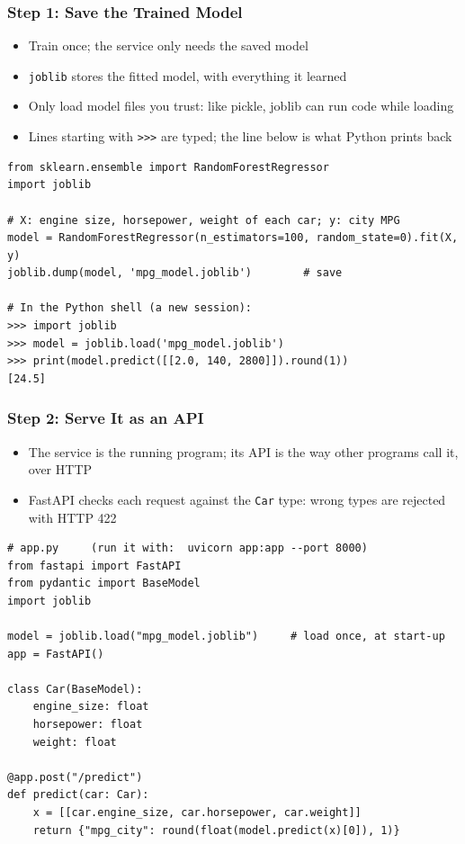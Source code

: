 \begin{frame}[fragile]\frametitle{Step 1: Save the Trained Model}
\begin{itemize}
\item Train once; the service only needs the saved model
\item \texttt{joblib} stores the fitted model, with everything it learned
\item Only load model files you trust: like pickle, joblib can run code while loading
\item Lines starting with \texttt{>>>} are typed; the line below is what Python prints back
\end{itemize}
\begin{lstlisting}
from sklearn.ensemble import RandomForestRegressor
import joblib

# X: engine size, horsepower, weight of each car; y: city MPG
model = RandomForestRegressor(n_estimators=100, random_state=0).fit(X, y)
joblib.dump(model, 'mpg_model.joblib')        # save

# In the Python shell (a new session):
>>> import joblib
>>> model = joblib.load('mpg_model.joblib')
>>> print(model.predict([[2.0, 140, 2800]]).round(1))
[24.5]
\end{lstlisting}
\end{frame}

\begin{frame}[fragile]\frametitle{Step 2: Serve It as an API}
\begin{itemize}
\item The service is the running program; its API is the way other programs call it, over HTTP
\item FastAPI checks each request against the \texttt{Car} type: wrong types are rejected with HTTP 422
\end{itemize}
\begin{lstlisting}
# app.py     (run it with:  uvicorn app:app --port 8000)
from fastapi import FastAPI
from pydantic import BaseModel
import joblib

model = joblib.load("mpg_model.joblib")     # load once, at start-up
app = FastAPI()

class Car(BaseModel):
    engine_size: float
    horsepower: float
    weight: float

@app.post("/predict")
def predict(car: Car):
    x = [[car.engine_size, car.horsepower, car.weight]]
    return {"mpg_city": round(float(model.predict(x)[0]), 1)}
\end{lstlisting}
\end{frame}


